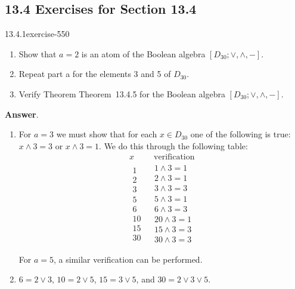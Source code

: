 \documentclass[twoside,10pt,]{book}
\numberwithin{equation}{section}
\begin{document}
\subsection*{13.4 Exercises for Section 13.4}
\begin{divisionsolution}{13.4.1}{}{exercise-550}%
\hypertarget{p-4932}{}%
\leavevmode%
\begin{enumerate}[label=(\alph*)]
\item\hypertarget{li-2240}{}\hypertarget{p-4933}{}%
Show that \(a = 2\) is an atom of the Boolean algebra \(\left[D_{30}; \lor , \land, - \right]\).%
\item\hypertarget{li-2241}{}\hypertarget{p-4934}{}%
Repeat part a for the elements 3 and 5 of \(D_{30}\).%
\item\hypertarget{li-2242}{}\hypertarget{p-4935}{}%
Verify Theorem Theorem~13.4.5 for the Boolean algebra \(\left[D_{30}; \lor , \land, - \right]\).%
\end{enumerate}
%
\par\smallskip%
\noindent\textbf{Answer}.\quad%
\hypertarget{p-4936}{}%
\leavevmode%
\begin{enumerate}[label=(\alph*)]
\item\hypertarget{li-2243}{}\hypertarget{p-4937}{}%
For \(a = 3\) we must show that for each \(x \in  D_{30}\)  one of the following is true: \(x\land 3=3\) or \(x\land 3=1\).  We do this through the following table:%
\begin{equation*}
\begin{array}{cc}
x & \textrm{ verification} \\
\hline
\begin{array}{c}
1 \\
2 \\
3 \\
5 \\
6 \\
10 \\
15 \\
30 \\
\end{array}
& 
\begin{array}{c}
1\land 3=1 \\
2\land 3=1 \\
3\land 3=3 \\
5\land 3=1 \\
6\land 3=3 \\
20\land 3=1 \\
15\land 3=3 \\
30\land 3=3 \\
\end{array}
\\
\end{array}
\end{equation*}
For \(a=5\), a similar verification can be performed.%
\item\hypertarget{li-2244}{}\hypertarget{p-4938}{}%
\(6 = 2 \lor  3\), \(10 = 2 \lor  5\), \(15 = 3 \lor  5\), and \(30 = 2 \lor  3 \lor  5\).%
\end{enumerate}
%
\end{divisionsolution}%
\end{document}

